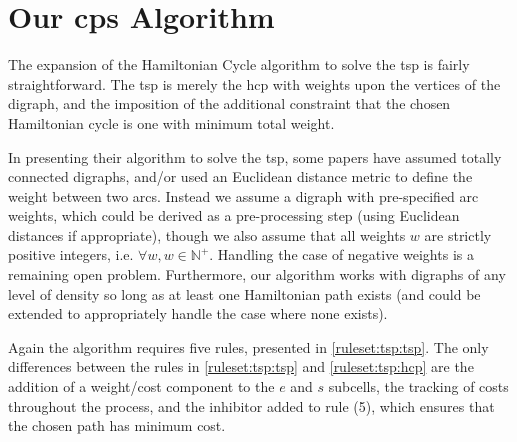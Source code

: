 \section{\label{sec:tsp:algotsp}Our \texorpdfstring{\gls{cps}}{cP systems} \texorpdfstring{}{Travelling Salesman Problem} Algorithm}

The expansion of the Hamiltonian Cycle algorithm to solve the \gls{tsp} is fairly straightforward.  The \gls{tsp} is merely the \gls{hcp} with weights upon the vertices of the digraph, and the imposition of the additional constraint that the chosen Hamiltonian cycle is one with minimum total weight.  

In presenting their algorithm to solve the \gls{tsp}, some papers have assumed totally connected digraphs, and/or used an Euclidean distance metric to define the weight between two arcs.  Instead we assume a digraph with pre-specified arc weights, which could be derived as a pre-processing step (using Euclidean distances if appropriate), though we also assume that all weights \(w\) are strictly positive integers, i.e. \(\forall w, w \in \mathbb{N^+}\).  Handling the case of negative weights is a remaining open problem.  Furthermore, our algorithm works with digraphs of any level of density so long as at least one Hamiltonian path exists (and could be extended to appropriately handle the case where none exists).


Again the algorithm requires five rules, presented in \autoref{ruleset:tsp:tsp}.  The only differences between the rules in \autoref{ruleset:tsp:tsp} and \autoref{ruleset:tsp:hcp} are the addition of a weight/cost component to the \(e\) and \(s\) subcells, the tracking of costs throughout the process, and the inhibitor added to rule (5), which ensures that the chosen path has minimum cost.


